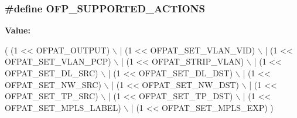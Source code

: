 \subsubsection[{\texorpdfstring{O\+F\+P\+\_\+\+S\+U\+P\+P\+O\+R\+T\+E\+D\+\_\+\+A\+C\+T\+I\+O\+NS}{OFP_SUPPORTED_ACTIONS}}]{\setlength{\rightskip}{0pt plus 5cm}\#define O\+F\+P\+\_\+\+S\+U\+P\+P\+O\+R\+T\+E\+D\+\_\+\+A\+C\+T\+I\+O\+NS}\hypertarget{openflow-interface_8h_ac2ef921103b49a54683f80f9e86de30c}{}\label{openflow-interface_8h_ac2ef921103b49a54683f80f9e86de30c}
{\bfseries Value\+:}
\begin{DoxyCode}
( (1 << OFPAT\_OUTPUT)             \(\backslash\)
                                | (1 << OFPAT\_SET\_VLAN\_VID)     \(\backslash\)
                                | (1 << OFPAT\_SET\_VLAN\_PCP)     \(\backslash\)
                                | (1 << OFPAT\_STRIP\_VLAN)       \(\backslash\)
                                | (1 << OFPAT\_SET\_DL\_SRC)       \(\backslash\)
                                | (1 << OFPAT\_SET\_DL\_DST)       \(\backslash\)
                                | (1 << OFPAT\_SET\_NW\_SRC)       \(\backslash\)
                                | (1 << OFPAT\_SET\_NW\_DST)       \(\backslash\)
                                | (1 << OFPAT\_SET\_TP\_SRC)       \(\backslash\)
                                | (1 << OFPAT\_SET\_TP\_DST)       \(\backslash\)
                                | (1 << OFPAT\_SET\_MPLS\_LABEL)   \(\backslash\)
                                | (1 << OFPAT\_SET\_MPLS\_EXP) )
\end{DoxyCode}
